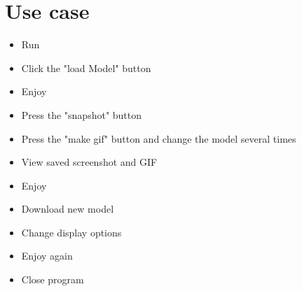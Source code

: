 \documentclass[12pt, a4paper]{article}
\begin{document}
\section{Use case}
  \begin{itemize}
    \item Run
    \item Click the "load Model" button
    \item Enjoy
    \item Press the "snapshot" button
    \item Press the "make gif" button and change the model several times
    \item View saved screenshot and GIF
    \item Enjoy
    \item Download new model
    \item Change display options
    \item Enjoy again
    \item Close program
  \end{itemize}
\end{document}
